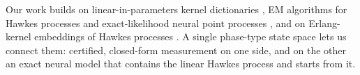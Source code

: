 Our work builds on linear-in-parameters kernel dictionaries \citep{bacry2015hawkes}, EM algorithms
for Hawkes processes \citep{veen2008estimation,zhou2013learning} and exact-likelihood neural point
processes \citep{omi2019fully,shchur2020intensity}, and on Erlang-kernel embeddings of Hawkes
processes \citep{duarte2019stability}. A single phase-type state space lets us connect
them: certified, closed-form measurement on one side, and on the other an exact neural model that
contains the linear Hawkes process and starts from it.
